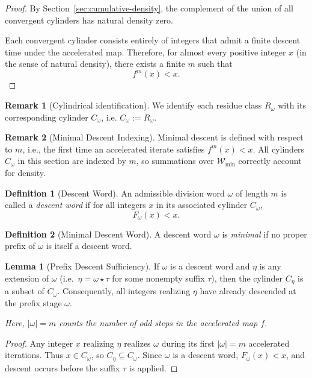\documentclass[12pt, oneside]{article}   	%
\numberwithin{equation}{section}          %
\theoremstyle{definition}
\newtheorem{define}{Definition}[section]
\newtheorem{lemma}[theorem]{Lemma}
\newtheorem*{remark}{Remark}
\begin{document}
\begin{proof}
By Section~\ref{sec:cumulative-density}, the complement of the union of all
convergent cylinders has natural density zero.

Each convergent cylinder consists entirely of integers that admit a finite
descent time under the accelerated map. Therefore, for almost every positive
integer $x$ (in the sense of natural density), there exists a finite $m$ such that
\[
f^m(x) < x.
\]
\end{proof}

\begin{remark}[Cylindrical identification]
We identify each residue class \(R_\omega\) with its corresponding cylinder \(C_\omega\), i.e.
\(C_\omega := R_\omega\).
\end{remark}

\begin{remark}[Minimal Descent Indexing]
Minimal descent is defined with respect to $m$, i.e., the first time
an accelerated iterate satisfies $f^m(x) < x$. All cylinders $C_\omega$ in
this section are indexed by $m$, so summations over $\mathcal{W}_{\min}$
correctly account for density.
\end{remark}

\begin{define}[Descent Word]
An admissible division word $\omega$ of length $m$ is called a \emph{descent word} if
for all integers $x$ in its associated cylinder $C_\omega$,
\[
F_\omega(x) < x.
\]
\end{define}

\begin{define}[Minimal Descent Word]
A descent word $\omega$ is \emph{minimal} if no proper prefix of $\omega$
is itself a descent word.
\end{define}

\begin{lemma}[Prefix Descent Sufficiency]
\label{lem:prefix-descent}
If $\omega$ is a descent word and $\eta$ is any extension of $\omega$
(i.e.\ $\eta = \omega \star \tau$ for some nonempty suffix $\tau$),
then the cylinder $C_\eta$ is a subset of $C_\omega$.
Consequently, all integers realizing $\eta$ have already descended
at the prefix stage $\omega$.

\emph{Here, $|\omega| = m$ counts the number of odd steps in the accelerated map $f$.}
\end{lemma}

\begin{proof}
Any integer $x$ realizing $\eta$ realizes $\omega$ during its first $|\omega| = m$
accelerated iterations. Thus $x \in C_\omega$, so $C_\eta \subseteq C_\omega$.
Since $\omega$ is a descent word, $F_\omega(x) < x$, and descent occurs
before the suffix $\tau$ is applied.
\end{proof}
\end{document}
